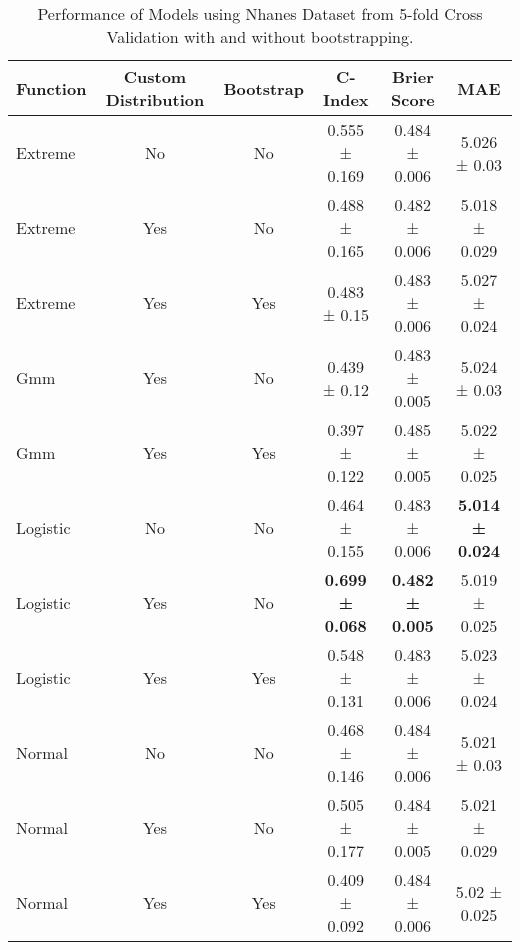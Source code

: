 \begin{table}[h!]
\centering
\caption{Performance of Models using Nhanes Dataset from 5-fold Cross Validation with and without bootstrapping.}
\label{tab:model_performance_nhanes_2}
\begin{tabular}{l|c|c|c|c|c}
\hline
\textbf{Function} & \textbf{Custom Distribution} & \textbf{Bootstrap} & \textbf{C-Index} & \textbf{Brier Score} & \textbf{MAE} \\
\hline
Extreme & No & No & 0.555 ± 0.169 & 0.484 ± 0.006 & 5.026 ± 0.03 \\
Extreme & Yes & No & 0.488 ± 0.165 & 0.482 ± 0.006 & 5.018 ± 0.029 \\
Extreme & Yes & Yes & 0.483 ± 0.15 & 0.483 ± 0.006 & 5.027 ± 0.024 \\
Gmm & Yes & No & 0.439 ± 0.12 & 0.483 ± 0.005 & 5.024 ± 0.03 \\
Gmm & Yes & Yes & 0.397 ± 0.122 & 0.485 ± 0.005 & 5.022 ± 0.025 \\
Logistic & No & No & 0.464 ± 0.155 & 0.483 ± 0.006 & \textbf{5.014 ± 0.024} \\
Logistic & Yes & No & \textbf{0.699 ± 0.068} & \textbf{0.482 ± 0.005} & 5.019 ± 0.025 \\
Logistic & Yes & Yes & 0.548 ± 0.131 & 0.483 ± 0.006 & 5.023 ± 0.024 \\
Normal & No & No & 0.468 ± 0.146 & 0.484 ± 0.006 & 5.021 ± 0.03 \\
Normal & Yes & No & 0.505 ± 0.177 & 0.484 ± 0.005 & 5.021 ± 0.029 \\
Normal & Yes & Yes & 0.409 ± 0.092 & 0.484 ± 0.006 & 5.02 ± 0.025 \\
\hline
\end{tabular}
\end{table}
